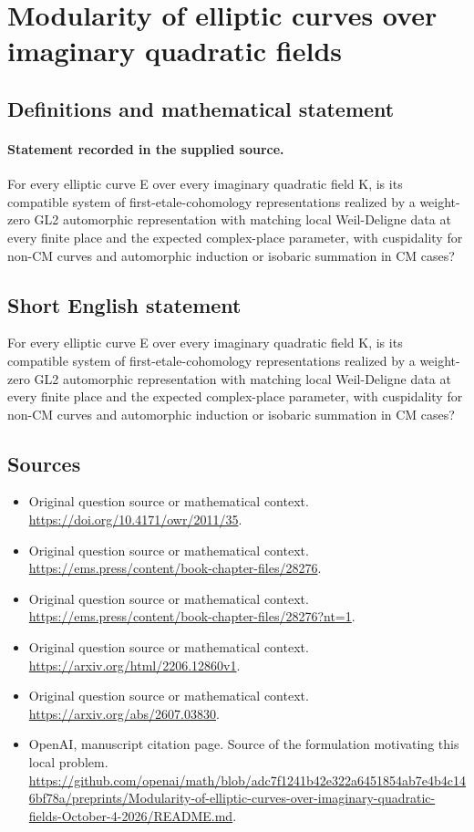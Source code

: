 \documentclass[11pt]{article}
\begin{document}
\section*{Modularity of elliptic curves over imaginary quadratic fields}\label{30007266}
\subsection{Definitions and mathematical statement}
\paragraph{Statement recorded in the supplied source.}
For every elliptic curve E over every imaginary quadratic field K, is its compatible system of first-etale-cohomology representations realized by a weight-zero GL2 automorphic representation with matching local Weil-Deligne data at every finite place and the expected complex-place parameter, with cuspidality for non-CM curves and automorphic induction or isobaric summation in CM cases?
\subsection{Short English statement}
For every elliptic curve E over every imaginary quadratic field K, is its compatible system of first-etale-cohomology representations realized by a weight-zero GL2 automorphic representation with matching local Weil-Deligne data at every finite place and the expected complex-place parameter, with cuspidality for non-CM curves and automorphic induction or isobaric summation in CM cases?
\subsection{Sources}
\begin{itemize}
\item[S1] Original question source or mathematical context.
\url{https://doi.org/10.4171/owr/2011/35}.
\item[S2] Original question source or mathematical context.
\url{https://ems.press/content/book-chapter-files/28276}.
\item[S3] Original question source or mathematical context.
\url{https://ems.press/content/book-chapter-files/28276?nt=1}.
\item[S4] Original question source or mathematical context.
\url{https://arxiv.org/html/2206.12860v1}.
\item[S5] Original question source or mathematical context.
\url{https://arxiv.org/abs/2607.03830}.
\item[S6] OpenAI, manuscript citation page. Source of the formulation motivating this local problem.
\url{https://github.com/openai/math/blob/adc7f1241b42e322a6451854ab7e4b4c146bf78a/preprints/Modularity-of-elliptic-curves-over-imaginary-quadratic-fields-October-4-2026/README.md}.
\end{itemize}
\end{document}
